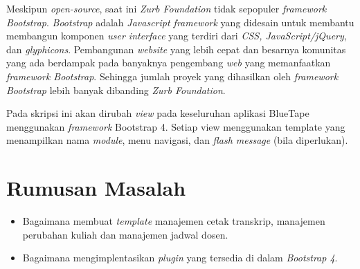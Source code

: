 \documentclass[a4paper,twoside]{article}
\begin{document}
Meskipun \textit{open-source}, saat ini \textit{Zurb Foundation} tidak sepopuler \textit{framework} \textit{Bootstrap}. 
\textit{Bootstrap} adalah \textit{ Javascript framework} yang didesain untuk membantu membangun komponen \textit{user interface} yang terdiri dari \textit{CSS, JavaScript/jQuery}, dan \textit{glyphicons}. Pembangunan \textit{website} yang lebih cepat dan besarnya komunitas yang ada berdampak pada banyaknya pengembang \textit{web} yang memanfaatkan \textit{framework Bootstrap}. Sehingga jumlah proyek yang dihasilkan oleh\textit{ framework Bootstrap} lebih banyak dibanding \textit{Zurb Foundation}. 

%

%
%
%
Pada skripsi ini akan dirubah \textit{view} pada keseluruhan  aplikasi BlueTape menggunakan \textit{framework} Bootstrap 4. Setiap view menggunakan template yang menampilkan nama \textit{module}, menu navigasi, dan \textit{flash message} (bila diperlukan).



\section{Rumusan Masalah}

\begin{itemize}
	\item Bagaimana membuat \textit{template} manajemen cetak transkrip, manajemen perubahan kuliah dan manajemen jadwal dosen.
	\item Bagaimana mengimplentasikan \textit{plugin} yang tersedia di dalam \textit{Bootstrap 4}.
\end{itemize}
\end{document}
